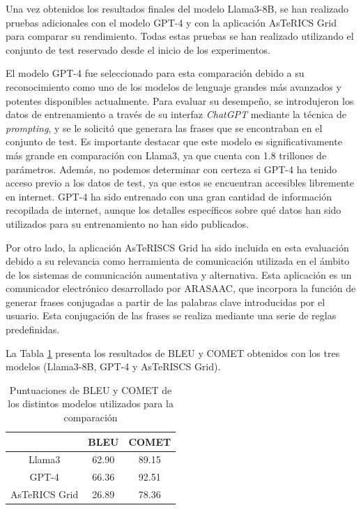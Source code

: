 \documentclass[11pt,spanish,listoffigures,listoftables]{tfgetsinf}
\begin{document}
Una vez obtenidos los resultados finales del modelo Llama3-8B, se han realizado pruebas adicionales con el modelo GPT-4 y con la aplicación AsTeRICS Grid para comparar su rendimiento. Todas estas pruebas se han realizado utilizando el conjunto de test reservado desde el inicio de los experimentos.

El modelo GPT-4 fue seleccionado para esta comparación debido a su reconocimiento como uno de los modelos de lenguaje grandes más avanzados y potentes disponibles actualmente. Para evaluar su desempeño, se introdujeron los datos de entrenamiento a través de su interfaz \textit{ChatGPT} mediante la técnica de \textit{prompting}, y se le solicitó que generara las frases que se encontraban en el conjunto de test. Es importante destacar que este modelo es significativamente más grande en comparación con Llama3, ya que cuenta con 1.8 trillones de parámetros. Además, no podemos determinar con certeza si GPT-4 ha tenido acceso previo a los datos de test, ya que estos se encuentran accesibles libremente en internet. GPT-4 ha sido entrenado con una gran cantidad de información recopilada de internet, aunque los detalles específicos sobre qué datos han sido utilizados para su entrenamiento no han sido publicados.

Por otro lado, la aplicación AsTeRISCS Grid ha sido incluida en esta evaluación debido a su relevancia como herramienta de comunicación utilizada en el ámbito de los sistemas de comunicación aumentativa y alternativa. Esta aplicación es un comunicador electrónico desarrollado por ARASAAC, que incorpora la función de generar frases conjugadas a partir de las palabras clave introducidas por el usuario. Esta conjugación de las frases se realiza mediante una serie de reglas predefinidas.

La Tabla \ref{tab:comparacionFinal} presenta los resultados de BLEU y COMET obtenidos con los tres modelos (Llama3-8B, GPT-4 y AsTeRISCS Grid).

\begin{table}[!h]
\caption{Puntuaciones de BLEU y COMET de los distintos modelos utilizados para la comparación}
\begin{center}
\begin{tabular}{ c | c c }
	\ & BLEU & COMET \\
	\hline
	\hline
	Llama3 & 62.90 & 89.15  \\
	GPT-4 & 66.36 & 92.51\\
	AsTeRICS Grid & 26.89 & 78.36 \\

\end{tabular}
\end{center}
\label{tab:comparacionFinal}
\end{table}
\end{document}
